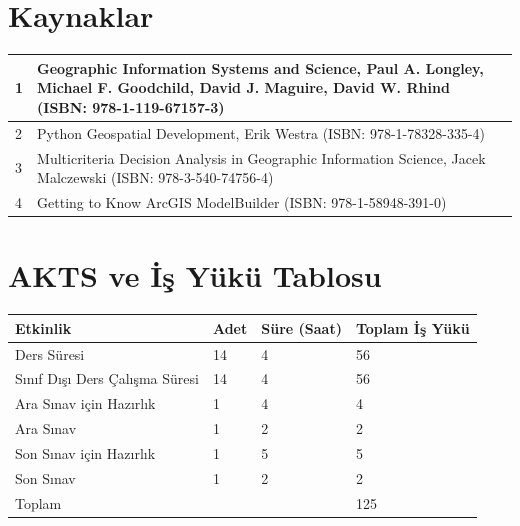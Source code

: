 \documentclass[10pt]{article}
\begin{document}
\section*{Kaynaklar}
\begin{tabularx}{\textwidth}{|l|X|}
\hline
1 & Geographic Information Systems and Science, Paul A. Longley, Michael F. Goodchild, David J. Maguire, David W. Rhind (ISBN: 978-1-119-67157-3) \\
\hline
2 & Python Geospatial Development, Erik Westra (ISBN: 978-1-78328-335-4) \\
\hline
3 & Multicriteria Decision Analysis in Geographic Information Science, Jacek Malczewski (ISBN: 978-3-540-74756-4) \\
\hline
4 & Getting to Know ArcGIS ModelBuilder (ISBN: 978-1-58948-391-0) \\
\hline
\end{tabularx}

\section*{AKTS ve İş Yükü Tablosu}
\begin{tabularx}{\textwidth}{|l|X|X|X|}
\hline
\textbf{Etkinlik} & \textbf{Adet} & \textbf{Süre (Saat)} & \textbf{Toplam İş Yükü} \\
\hline
Ders Süresi & 14 & 4 & 56 \\
\hline
Sınıf Dışı Ders Çalışma Süresi & 14 & 4 & 56 \\
\hline
Ara Sınav için Hazırlık & 1 & 4 & 4 \\
\hline
Ara Sınav & 1 & 2 & 2 \\
\hline
Son Sınav için Hazırlık & 1 & 5 & 5 \\
\hline
Son Sınav & 1 & 2 & 2 \\
\hline
Toplam & & & 125 \\
\hline
\end{tabularx}
\end{document}
